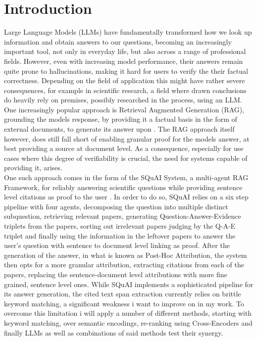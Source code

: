 \chapter{Introduction}
\label{cha:Introduction}

Large Language Models (LLMs) have fundamentally transformed how we look up information and obtain answers to our questions, becoming an increasingly important tool, not only in everyday life, but also across a range of professional fields. However, even with increasing model performance, their answers remain quite prone to hallucinations, making it hard for users to verify the their factual correctness. Depending on the field of application this might have rather severe consequences, for example in scientific research, a field where drawn conclusions do heavily rely on premises, possibly researched in the process, using an LLM. One increasingly popular approach is Retrieval Augmented Generation (RAG), grounding the models response, by providing it a factual basis in the form of external documents, to generate its answer upon \cite{sharma2025retrievalaugmentedgenerationcomprehensivesurvey}. The RAG approach itself however, does still fall short of enabling granular proof for the models answer, at best providing a source at document level. As a consequence, especially for use cases where this degree of verifiability is crucial, the need for systems capable of providing it, arises.\\One such approach comes in the form of the SQuAI System, a multi-agent RAG Framework, for reliably answering scientific questions while providing sentence level citations as proof to the user \cite{SQuAI}. In order to do so, SQuAI relies on a six step pipeline with four agents, decomposing the question into multiple distinct subquestion, retrieving relevant papers, generating Question-Answer-Evidence triplets from the papers, sorting out irrelevant papers judging by the Q-A-E triplet and finally using the information in the leftover papers to answer the user's question with sentence to document level linking as proof. After the generation of the answer, in what is known as Post-Hoc Attribution, the system then opts for a more granular attribution, extracting citations from each of the papers, replacing the sentence-document level attributions with more fine grained, sentence level ones. While SQuAI implements a sophisticated pipeline for its answer generation, the cited text span extraction currently relies on brittle keyword matching, a significant weakness i want to improve on in my work. To overcome this limitation i will apply a number of different methods, starting with keyword matching, over semantic encodings, re-ranking using Cross-Encoders and finally LLMs as well as combinations of said methods test their synergy. \\
